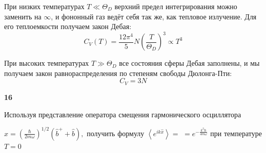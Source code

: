 \documentclass[a4paper,12pt]{article} %
\begin{document}
\begin{ttask}
При низких температурах $T \ll \Theta_{D}$ верхний предел интегрирования можно заменить на $\infty$, 
и фононный газ ведёт себя так же, как тепловое излучение. 
Для его теплоемкости получаем закон Дебая:
$$
C_{V}(T)=\frac{12 \pi^{4}}{5} N\left(\frac{T}{\Theta_{D}}\right)^{3} \propto T^{3}
$$




При высоких температурах $T \gg \Theta_{D}$ все состояния сферы Дебая заполнены, 
и мы получаем закон равнораспределения по степеням свободы Дюлонга-Пти:
$$
C_{V}=3 N
$$




\end{ttask}


\begin{ttask}\textbf{16}

Используя представление оператора смещения гармонического осциллятора 

$\hat{x}=\left(\frac{\hbar}{2 m \omega}\right)^{1 / 2}\left(\hat{b}^{+}+\hat{b}\right),$ 
получить формулу $\left\langle e^{i k \hat{x}}\right\rangle=$
$=e^{-\frac{k^{2} \hbar}{4 m \omega}}$ при температуре $T=0$

















\end{ttask}
\end{document}
